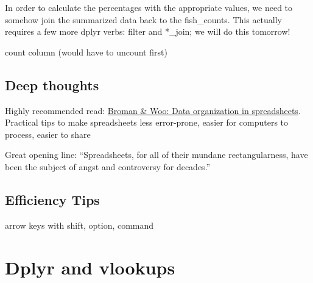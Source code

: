 \documentclass[]{book}
\newenvironment{Shaded}{\begin{snugshade}}{\end{snugshade}}
\newcommand{\CommentTok}[1]{\textcolor[rgb]{0.56,0.35,0.01}{\textit{#1}}}
\newcommand{\DataTypeTok}[1]{\textcolor[rgb]{0.13,0.29,0.53}{#1}}
\newcommand{\DecValTok}[1]{\textcolor[rgb]{0.00,0.00,0.81}{#1}}
\newcommand{\KeywordTok}[1]{\textcolor[rgb]{0.13,0.29,0.53}{\textbf{#1}}}
\newcommand{\NormalTok}[1]{#1}
\newcommand{\OperatorTok}[1]{\textcolor[rgb]{0.81,0.36,0.00}{\textbf{#1}}}
\newcommand{\StringTok}[1]{\textcolor[rgb]{0.31,0.60,0.02}{#1}}
\begin{document}
\begin{Shaded}
\end{Shaded}

In order to calculate the percentages with the appropriate values, we need to somehow join the summarized data back to the fish\_counts. This actually requires a few more dplyr verbs: filter and *\_join; we will do this tomorrow!

count column (would have to uncount first)

\hypertarget{deep-thoughts-1}{%
\section{Deep thoughts}\label{deep-thoughts-1}}

Highly recommended read: \href{https://peerj.com/preprints/3183/}{Broman \& Woo: Data organization in spreadsheets}. Practical tips to make spreadsheets less error-prone, easier for computers to process, easier to share

Great opening line: ``Spreadsheets, for all of their mundane rectangularness, have been the subject of angst and controversy for decades.''

\hypertarget{efficiency-tips-3}{%
\section{Efficiency Tips}\label{efficiency-tips-3}}

arrow keys with shift, option, command

\hypertarget{vlookup}{%
\chapter{Dplyr and vlookups}\label{vlookup}}
\end{document}
